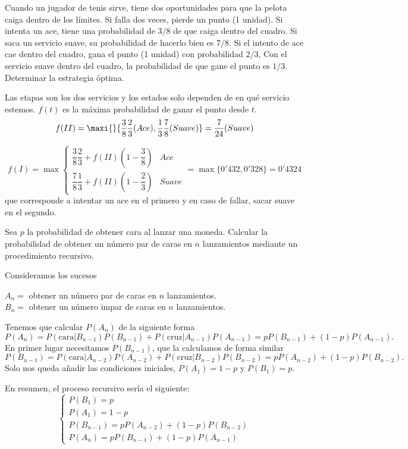\documentclass[twoside]{article}
\begin{document}
\newpage
\begin{ejercicio}{8} 
Cuando un jugador de tenis sirve, tiene dos oportunidades para que la pelota caiga dentro de los límites. Si falla dos veces, pierde un punto (1 unidad). Si intenta un ace, tiene una probabilidad de $3/8$ de que caiga dentro del cuadro. Si saca un servicio suave, su probabilidad de hacerlo bien es $7/8$. Si el intento de ace cae dentro del cuadro, gana el punto (1 unidad) con probabilidad $2/3$, Con el servicio suave dentro del cuadro, la probabilidad de que gane el punto es $1/3$. Determinar la estrategia óptima.
\end{ejercicio}
\begin{solucion}
Las etapas son los dos servicios y los estados solo dependen de en qué servicio estemos. $f(t)$ es la máxima probabilidad de ganar el punto desde $t$. 
$$f(II)=
\maxi{}{\frac{3}{8}\frac{2}{3} (Ace),\frac{1}{3}\frac{7}{8}(Suave)}=\frac{7}{24}(Suave)
$$

$$f(I)=\max\begin{cases}
\dfrac{3}{8}\dfrac{2}{3}+f(II)\left(1-\dfrac{3}{8}\right) & Ace\\
\dfrac{7}{8}\dfrac{1}{3}+f(II)\left(1-\dfrac{2}{3}\right) & Suave
\end{cases}=\max\{0'432,0'328\}=0'4324$$ que corresponde a intentar un ace en el primero y en caso de fallar, sacar suave en el segundo.
\end{solucion}

\newpage

\begin{ejercicio}{9}
Sea $p$ la probabilidad de obtener cara al lanzar una moneda. Calcular la probabilidad de
obtener un número par de caras en $n$ lanzamientos mediante un procedimiento recursivo.
\end{ejercicio}
\begin{solucion}
Consideramos los sucesos 

$A_n=$ obtener un número par de caras en $n$ lanzamientos.\\
$B_n=$ obtener un número impar de caras en $n$ lanzamientos.

Tenemos que calcular $P(A_n)$ de la siguiente forma
$$P(A_n)=P(\text{cara}|B_{n-1})P(B_{n-1})+P(\text{cruz}|A_{n-1})P(A_{n-1})=pP(B_{n-1})+(1-p)P(A_{n-1}).$$
En primer lugar necesitamos $P(B_{n-1})$, que la calculamos de forma similar
$$P(B_{n-1})=P(\text{cara}|A_{n-2})P(A_{n-2})+P(\text{cruz}|B_{n-2})P(B_{n-2})=pP(A_{n-2})+(1-p)P(B_{n-2}).$$
Solo nos queda añadir las condiciones iniciales, $P(A_1)=1-p$ y $P(B_1)=p$. 

En resumen, el proceso recursivo sería el siguiente:
$$\begin{cases}
P(B_1)=p\\
P(A_1)=1-p\\
P(B_{n-1})=pP(A_{n-2})+(1-p)P(B_{n-2})\\
P(A_n)=pP(B_{n-1})+(1-p)P(A_{n-1})
\end{cases}$$
\end{solucion}
\end{document}
